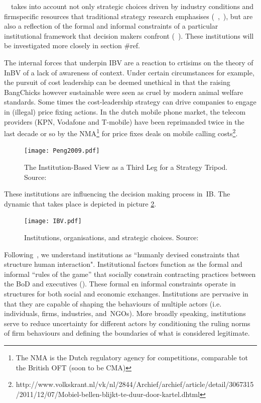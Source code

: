 ~\ibv~takes into 
account not only strategic choices driven by industry conditions and firm\-specific resources that 
traditional strategy research emphasises (~\cite{Porter:1980},~\cite{Barney:1991}), but are also a 
reflection of the formal and informal constraints of a particular institutional framework that decision
makers confront (~\cite{Oliver:1997,Scott:1995}). These institutions will be investigated more closely in section #ref.

The internal forces that underpin \gls{IBV} are a reaction to crtisims on the theory of \gls{InBV} of a lack of awareness of context\cite{narayanan}. Under certain circumstances for example, the pursuit of cost leadership can be deemed unethical in that the raising BangChicks however sustainable were seen as cruel by modern animal welfare standards. 
Some times the cost-leadership strategy can drive companies to engage in (illegal) price fixing actions. In the dutch mobile phone market, the telecom providers (KPN, Vodafone and T-mobile) have been reprimanded twice in the last decade or so by the \gls{NMA}\footnote{The \gls{NMA} is the Dutch regulatory agency for competitions, comparable tot the British \gls{OFT} (soon to be \gls{CMA}) } for price fixes deals on mobile calling costs\footnote{http://www.volkskrant.nl/vk/nl/2844/Archief/archief/article/detail/3067315/2011/12/07/Mobiel-bellen-blijkt-te-duur-door-kartel.dhtml}.

\begin{figure}[htbp!] 
	\centering
	\texttt{[image: Peng2009.pdf]}
 	\caption{The Institution-Based View as a Third Leg for a Strategy Tripod. Source: \cite{Peng:2009}}
	\label{fig:ibv2}
\end{figure}


These institutions are influencing the decision making process in~\gls{IB}.  The dynamic that takes place is depicted in picture \ref{fig:ibv}. 
\begin{figure}[htbp!] 
	\centering
	\texttt{[image: IBV.pdf]}
 	\caption{Institutions, organisations, and strategic choices. Source: \cite{Peng:2000}}
	\label{fig:ibv}
\end{figure}


Following~\cite{North:1990}, we understand institutions as ``humanly devised constraints
that structure human interaction". Institutional factors function as the formal and
informal ``rules of the game'' that socially constrain contracting practices between the \gls{BoD} and 
executives (\cite{North:1990}).  
These formal en informal constraints operate in structures for both social and economic exchanges. 
Institutions are pervasive in that they are capable of shaping the behaviours of multiple actors (i.e. 
individuals, firms, industries, and~\glspl{NGO}). More broadly speaking, institutions serve to reduce 
uncertainty for different actors by conditioning the ruling norms of firm behaviours and defining the 
boundaries of what is considered legitimate.~\cite{Peng:2008}\\

